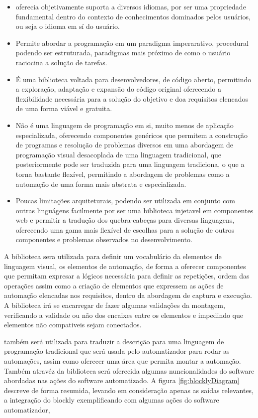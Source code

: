 \documentclass[tg]{mdtufsm}
\begin{document}
                \begin{itemize}
                    \item oferecia objetivamente suporta a diversos idiomas, por ser uma propriedade fundamental dentro do contexto de conhecimentos dominados pelos usuários, ou seja o idioma em sí do usuário.
                    \item Permite abordar a programação em um paradigma imperarativo, procedural podendo ser estruturada, paradigmas mais próximo de como o usuário raciocina a solução de tarefas.
                    \item É uma biblioteca voltada para desenvolvedores, de código aberto, permitindo a exploração, adaptação e expansão do código original oferecendo a flexibilidade necessária para a solução do objetivo e doa requisitos elencados de uma forma viável e gratuita.
                    \item Não é uma linguagem de programação em si, muito menos de aplicação especializada, oferecendo componentes genéricos que permitem a construção de programas e resolução de problemas diversos em uma abordagem de programação visual desacoplada de uma linguagem tradicional, que posteriormente pode ser traduzida para uma linguagem tradiciona, o que a torna bastante flexível, permitindo a abordagem de problemas como a automação de uma forma mais abstrata e especializada.
                    \item Poucas limitações arquiteturais, podendo ser utilizada em conjunto com outras linguágens facilmente por ser uma biblioteca injetavel em componentes web e permitir a tradução dos quebra-cabeças para diversas linguagens, oferecendo uma gama mais flexível de escolhas para a solução de outros componentes e problemas observados no desenvolvimento.
                \end{itemize}

                A biblioteca sera utilizada para definir um vocabulário da elementos de linguagem visual, os elementos de automação, de forma a oferecer componentes que permitam expresar a lógicos necessária para definir as repetições, ordem das operações assim como a criação de elementos que expressem as ações de automação elencadas nos requisitos, dentro da abordagem de captura e execução. A biblioteca irá se encarregar de fazer algumas validações da montagem, verificando a validade ou não dos encaixes entre os elementos e impedindo que elementos não compativeis sejam conectados.

                também será utilizada para traduzir a descrição para uma linguagem de programação tradicional que será usada pelo automatizador para rodar as automações, assim como oferecer uma área que permita montar a automação. Também atravéz da biblioteca será oferecida algumas nuncionalidades do software abordadas nas ações do software automatizado. A figura \ref{fig:blocklyDiagram} descreve de forma resumida, levando em consideração apenas as saídas relevantes, a integração do blockly exemplificando com algumas ações do software automatizador,
\end{document}
